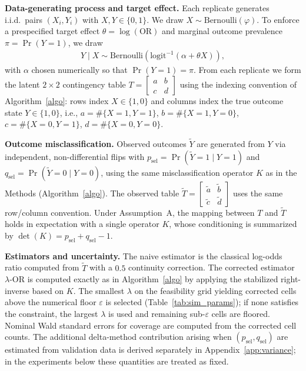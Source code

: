 \documentclass[pdflatex,sn-mathphys-num]{sn-jnl}%
\def\EQSP{3pt}
\newcommand{\cgather}[2][\EQSP]{\begingroup\setlength\abovedisplayskip{#1}\setlength\belowdisplayskip{#1}\begin{gather} #2 \end{gather}\endgroup\noindent}
\newcommand{\SPOR}{\textrm{$\lambda$-OR}}
\theoremstyle{thmstyleone}%
\theoremstyle{thmstyletwo}%
\theoremstyle{thmstylethree}%
\begin{document}
\textbf{Data-generating process and target effect.}
Each replicate generates i.i.d.\ pairs \((X_i,Y_i)\) with \(X,Y\in\{0,1\}\).
We draw \(X\sim\mathrm{Bernoulli}(\varphi)\).
To enforce a prespecified target effect
\(\theta=\log(\mathrm{OR})\) and marginal outcome prevalence
\(\pi=\Pr(Y=1)\), we draw
\cgather{
Y\mid X \sim \mathrm{Bernoulli}\!\left(\mathrm{logit}^{-1}(\alpha+\theta X)\right),
}
with \(\alpha\) chosen numerically so that \(\Pr(Y=1)=\pi\).
From each replicate we form the latent \(2\times2\) contingency table
\(
T=\begin{bmatrix}
a & b\\
c & d
\end{bmatrix}
\)
using the indexing convention of Algorithm~\ref{algo}:
rows index \(X\in\{1,0\}\) and columns index the true outcome state
\(Y\in\{1,0\}\), i.e.,
\(a=\#\{X{=}1,Y{=}1\}\),
\(b=\#\{X{=}1,Y{=}0\}\),
\(c=\#\{X{=}0,Y{=}1\}\),
\(d=\#\{X{=}0,Y{=}0\}\).

\textbf{Outcome misclassification.}
Observed outcomes \(\tilde Y\) are generated from \(Y\) via independent,
non-differential flips with
\(p_{\mathrm{sel}}=\Pr(\tilde Y=1\mid Y=1)\)
and
\(q_{\mathrm{sel}}=\Pr(\tilde Y=0\mid Y=0)\),
using the same misclassification operator \(K\) as in the Methods
(Algorithm~\ref{algo}).
The observed table
\(
\tilde T=\begin{bmatrix}
\tilde a & \tilde b\\
\tilde c & \tilde d
\end{bmatrix}
\)
uses the same row/column convention.
Under Assumption~A, the mapping between \(T\) and \(\tilde T\) holds in expectation with a single operator \(K\),
whose conditioning is summarized by
\(\det(K)=p_{\mathrm{sel}}+q_{\mathrm{sel}}-1\).

\textbf{Estimators and uncertainty.}
The naive estimator is the classical log-odds ratio computed from
\(\tilde T\) with a \(0.5\) continuity correction.
The corrected estimator \(\SPOR\) is computed exactly as in
Algorithm~\ref{algo} by applying the stabilized right-inverse based on \(K\).
The smallest \(\lambda\) on the feasibility grid yielding corrected cells above
the numerical floor \(\varepsilon\) is selected
(Table~\ref{tab:sim_params}); if none satisfies the constraint,
the largest \(\lambda\) is used and remaining sub-\(\varepsilon\)
cells are floored.
Nominal Wald standard errors for coverage are computed from the corrected cell counts.
The additional delta-method contribution arising when
\((p_{\mathrm{sel}},q_{\mathrm{sel}})\) are estimated from validation data is derived
separately in Appendix~\ref{app:variance}; in the experiments below these
quantities are treated as fixed.
\end{document}
